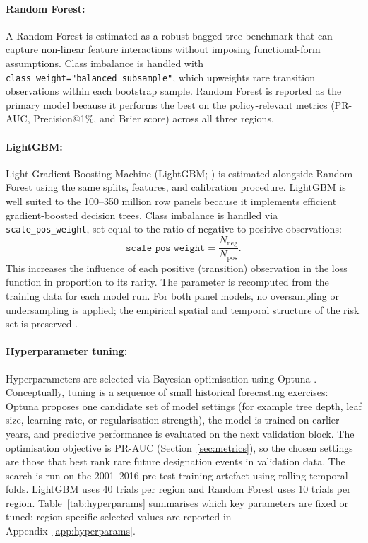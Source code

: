 \documentclass[12pt]{article}
\theoremstyle{break}
\begin{document}
\paragraph{Random Forest:}
A Random Forest \citep{breiman2001} is estimated as a robust bagged-tree benchmark
that can capture non-linear feature interactions without imposing functional-form
assumptions. Class imbalance is handled with
\texttt{class\_weight="balanced\_subsample"}, which upweights rare transition
observations within each bootstrap sample.
Random Forest is reported as the primary model because it performs the best on the
policy-relevant metrics (PR-AUC, Precision@1\%, and Brier score) across all three
regions.

\paragraph{LightGBM:}
Light Gradient-Boosting Machine (LightGBM; \citealp{ke2017}) is estimated alongside
Random Forest using the same splits, features, and calibration procedure. LightGBM is
well suited to the 100--350 million row panels because it implements efficient
gradient-boosted decision trees. Class imbalance is handled via
\texttt{scale\_pos\_weight}, set equal to the ratio of negative to positive
observations:
\begin{equation}
  \texttt{scale\_pos\_weight} = \frac{N_{\text{neg}}}{N_{\text{pos}}}.
  \label{eq:spw}
\end{equation}
This increases the influence of each positive (transition) observation in the loss
function in proportion to its rarity. The parameter is recomputed from the training
data for each model run. For both panel models, no oversampling or undersampling is
applied; the empirical spatial and temporal structure of the risk set is preserved
\citep{elkan2001}.

\paragraph{Hyperparameter tuning:}
Hyperparameters are selected via Bayesian optimisation using Optuna
\citep{akiba2019}. Conceptually, tuning is a sequence of small historical forecasting
exercises: Optuna proposes one candidate set of model settings (for example tree
depth, leaf size, learning rate, or regularisation strength), the model is trained on
earlier years, and predictive performance is evaluated on the next validation block.
The optimisation objective is PR-AUC (Section~\ref{sec:metrics}), so the chosen
settings are those that best rank rare future designation events in validation data.
The search is run on the 2001--2016 pre-test training artefact using rolling temporal
folds. LightGBM uses 40 trials per region and Random Forest uses 10 trials per
region. Table~\ref{tab:hyperparams} summarises which key parameters are fixed or
tuned; region-specific selected values are reported in Appendix~\ref{app:hyperparams}.
\end{document}
